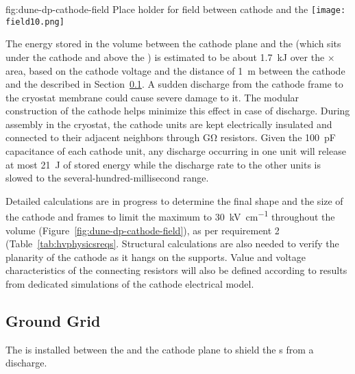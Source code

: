 \begin{dunefigure}{fig:dune-dp-cathode-field}
{Place holder for field between cathode and the } 
\texttt{[image: field10.png]}
\end{dunefigure}
The energy stored in the volume between the cathode plane and the  (which sits under the cathode and above the ) is estimated to be about \SI{1.7}{\kilo\joule} over the \dptpcwdth $\times$ \dptpclen area, based on the cathode voltage and the distance of \SI{1}{\m} between the cathode and the  described in Section~\ref{sec:dp-hv-groundgrid}. 
A sudden discharge from the cathode frame to the cryostat membrane could cause severe damage to it.
  The modular construction of the cathode helps minimize this effect in case of discharge. During assembly in the cryostat, the cathode units are kept electrically insulated and connected to their adjacent neighbors through \si{\giga\ohm}  
resistors. Given the \SI{100}{\pico\farad} capacitance of each cathode unit, any discharge occurring in one unit will release at most 
\SI{21}{\joule} of stored energy while the discharge rate  
to the other units is slowed to the several-hundred-millisecond range.

Detailed calculations are in progress to determine the final shape and the size of the cathode and  frames to %
limit the maximum \efield to \SI{30}{\kV\per\cm}  
throughout the \lar volume (Figure~\ref{fig:dune-dp-cathode-field}), as per requirement 2 (Table~\ref{tab:hvphysicsreqs}.  Structural calculations are also needed to verify the planarity of the cathode as it hangs on the  supports.
Value and voltage characteristics of the connecting resistors will also be defined according to results from dedicated simulations of the cathode electrical model.


\subsection{Ground Grid}
\label{sec:dp-hv-groundgrid}
The  is installed between the  and the cathode plane to shield the \pmt{}s from a discharge.  

